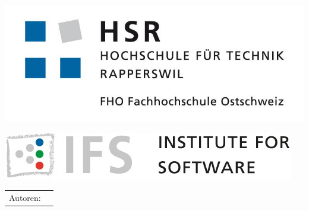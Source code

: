 

\begin{titlepage}

\begin{center}
\begin{minipage}[t]{0.45\textwidth}
    \includegraphics[width=\textwidth]{start/img/hsrLogo}
\end{minipage}
\hspace{\fill} %
\begin{minipage}[t]{0.45\textwidth}
    \vspace{-2.56cm}
    \includegraphics[width=\textwidth]{start/img/ifsLogo}
\end{minipage}

\end{center}

\vspace{15ex} %
\Huge
\textbf{\titel}

\LARGE
\textbf{\subtitel}

\vspace{4ex}
\huge
\textbf{\work}

\vspace{1ex}
\LARGE 
\place

\vspace{5ex}
\timeperiod

\vspace{11ex}
\begin{tabular}{ll} %
	Autoren:        & \authors    \\
\end{tabular}

\end{titlepage}

\restoregeometry %
